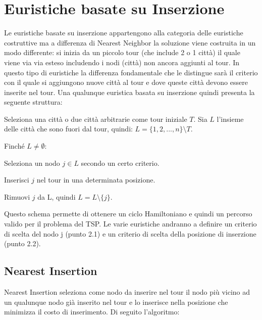 \documentclass[a4paper,12pt]{report}
\begin{document}
\section{Euristiche basate su Inserzione}
Le euristiche basate su inserzione appartengono alla categoria delle euristiche costruttive ma a differenza di Nearest Neighbor la soluzione viene costruita in un modo differente: si inizia da un piccolo tour (che include 2 o 1 città) il quale viene via via esteso includendo i nodi (città) non ancora aggiunti al tour. In questo tipo di euristiche la differenza fondamentale che le distingue sarà il criterio con il quale si aggiungono nuove città al tour e dove queste città devono essere inserite nel tour. Una qualunque euristica basata su inserzione quindi presenta la seguente struttura:

\begin{tcolorbox}[colframe=black,colback=white,boxrule=0.5pt, sharp corners]
\begin{legal}
  \item Seleziona una città o due città arbitrarie come tour iniziale $T$. Sia $L$ l'insieme delle città che sono fuori dal tour, quindi: $L = \{1, 2, ..., n\} \setminus T$.
  \item Finché $L \neq \emptyset$:
  \begin{legal}
    \item Seleziona un nodo $j \in L$ secondo un certo criterio.
    \item Inserisci $j$ nel tour in una determinata posizione.
    \item Rimuovi $j$ da L, quindi $L = L \setminus \{j\}$.
  \end{legal}
\end{legal}
\end{tcolorbox}
\hfill \break
Questo schema permette di ottenere un ciclo Hamiltoniano e quindi un percorso valido per il problema del TSP. Le varie euristiche andranno a definire un criterio di scelta del nodo j (punto 2.1) e un criterio di scelta della posizione di inserzione (punto 2.2).

\subsection{Nearest Insertion}
Nearest Insertion seleziona come nodo da inserire nel tour il nodo più vicino ad un qualunque nodo già inserito nel tour e lo inserisce nella posizione che minimizza il costo di inserimento. Di seguito l'algoritmo:
\end{document}
